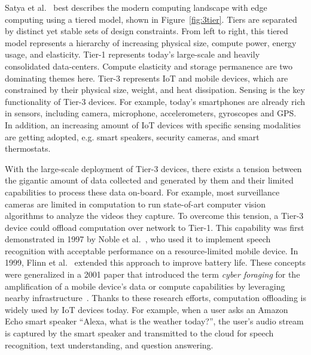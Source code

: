 Satya et al.~\cite{satya2019computing} best describes the modern computing
landscape with edge computing using a tiered model, shown in
Figure~\ref{fig:3tier}. Tiers are separated by distinct yet stable sets of
design constraints. From left to right, this tiered model represents a hierarchy
of increasing physical size, compute power, energy usage, and elasticity. Tier-1
represents today's large-scale and heavily consolidated data-centers. Compute
elasticity and storage permanence are two dominating themes here. Tier-3
represents IoT and mobile devices, which are constrained by their physical size,
weight, and heat dissipation. Sensing is the key functionality of Tier-3
devices. For example, today's smartphones are already rich in sensors, including
camera, microphone, accelerometers, gyroscopes and GPS. In addition, an
increasing amount of IoT devices with specific sensing modalities are getting
adopted, e.g. smart speakers, security cameras, and smart thermostats. 

With the large-scale deployment of Tier-3 devices, there exists a tension
between the gigantic amount of data collected and generated by them and their
limited capabilities to process these data on-board. For example, most
surveillance cameras are limited in computation to run state-of-art computer
vision algorithms to analyze the videos they capture. To overcome this tension,
a Tier-3 device could offload computation over network to Tier-1. This
capability was first demonstrated in 1997 by Noble et al.~\cite{Noble1997}, who
used it to implement speech recognition with acceptable performance on a
resource-limited mobile device. In 1999, Flinn et al.~\cite{Flinn1999} extended
this approach to improve battery life.  These concepts were generalized in a
2001 paper that introduced the term {\em cyber foraging} for the amplification
of a mobile device's data or compute capabilities by leveraging nearby
infrastructure~\cite{Satya2001}.  Thanks to these research efforts, computation
offloading is widely used by IoT devices today. For example, when a user asks an
Amazon Echo smart speaker ``Alexa, what is the weather today?'', the user's
audio stream is captured by the smart speaker and transmitted to the cloud for
speech recognition, text understanding, and question answering.

